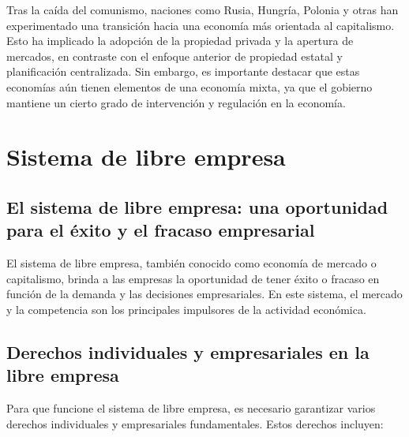 \documentclass[
  man,
  floatsintext,
  longtable,
  a4paper,
  nolmodern,
  notxfonts,
  notimes,
  12pt,
  colorlinks=true,linkcolor=blue,citecolor=blue,urlcolor=blue]{apa7}
\begin{document}
Tras la caída del comunismo, naciones como Rusia, Hungría, Polonia y
otras han experimentado una transición hacia una economía más orientada
al capitalismo. Esto ha implicado la adopción de la propiedad privada y
la apertura de mercados, en contraste con el enfoque anterior de
propiedad estatal y planificación centralizada. Sin embargo, es
importante destacar que estas economías aún tienen elementos de una
economía mixta, ya que el gobierno mantiene un cierto grado de
intervención y regulación en la economía.

\section{Sistema de libre empresa}\label{sistema-de-libre-empresa}

\subsection{El sistema de libre empresa: una oportunidad para el éxito y
el fracaso
empresarial}\label{el-sistema-de-libre-empresa-una-oportunidad-para-el-uxe9xito-y-el-fracaso-empresarial}

El sistema de libre empresa, también conocido como economía de mercado o
capitalismo, brinda a las empresas la oportunidad de tener éxito o
fracaso en función de la demanda y las decisiones empresariales. En este
sistema, el mercado y la competencia son los principales impulsores de
la actividad económica.

\subsection{Derechos individuales y empresariales en la libre
empresa}\label{derechos-individuales-y-empresariales-en-la-libre-empresa}

Para que funcione el sistema de libre empresa, es necesario garantizar
varios derechos individuales y empresariales fundamentales. Estos
derechos incluyen:
\end{document}
